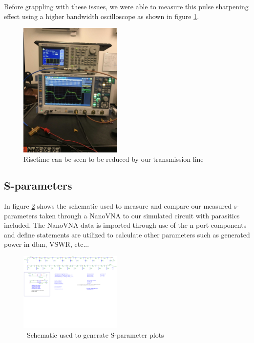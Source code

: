 \documentclass[journal]{IEEEtran}
\begin{document}
Before grappling with these issues, we were able to measure this pulse sharpening effect using a higher bandwidth oscilloscope as shown in figure \ref{fig:RandSScope}. 


\begin{figure}[htb]
\centering
\includegraphics[width=0.45\textwidth]{Risetime_RandS}
\caption{Risetime can be seen to be reduced by our transmission line}
\label{fig:RandSScope}
\end{figure}

\subsection{S-parameters}

In figure \ref{fig:sparamSchem} shows the schematic used to measure and compare our measured s-parameters taken through a NanoVNA to our simulated circuit with parasitics included. The NanoVNA data is imported through use of the n-port components and define statements are utilized to calculate other parameters such as generated power in dbm, VSWR, etc...


\begin{figure}[htb]
\centering
\includegraphics[width=0.45\textwidth,page = 1]{images/MostRecentSparamMeasSchem.pdf}
\caption{\ Schematic used to generate S-parameter plots  
}\label{fig:sparamSchem}
\end{figure}
\end{document}
